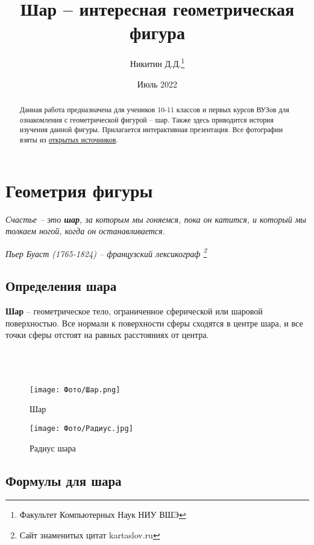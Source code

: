 \documentclass[14pt,a4paper]{report}
\title{Шар -- интересная геометрическая фигура}
\author{Никитин Д.Д.\thanks{Факультет Компьютерных Наук НИУ ВШЭ}}
\date{Июль 2022}
\begin{document}
\maketitle


\begin{abstract}
Данная работа предназначена для учеников 10-11 классов и первых курсов ВУЗов для ознакомления с геометрической фигурой -- шар. Также здесь приводится история изучения данной фигуры. Прилагается интерактивная презентация. Все фотографии взяты из \underline{открытых источников}.
\end{abstract}


\tableofcontents
\chapter{Геометрия фигуры}

\begin{displayquote}
\textit{Счастье -- это \textbf{шар}, за которым мы гоняемся, пока он катится, и который мы толкаем ногой, когда он останавливается.}
\end{displayquote}
\begin{flushright}
\textit{Пьер Буаст (1765-1824) -- французский лексикограф \footnote[1]{Сайт знаменитых цитат kartaslov.ru}}
\end{flushright}

\section[Определения]{Определения шара}


\textbf{Шар} -- геометрическое тело, ограниченное сферической или шаровой  поверхностью. Все нормали к поверхности сферы сходятся в центре шара, и все точки сферы отстоят на равных расстояниях от центра. \cite{dictionary1890efrona} \\\\\\\\

\begin{figure}[htb]
    \texttt{[image: Фото/Шар.png]}
    \caption{Шар}
\endminipage\hfill
{}
    \texttt{[image: Фото/Радиус.jpg]}
    \caption{Радиус шара}
\endminipage
\end{figure}

\newpage


\section[Формулы]{Формулы для шара}
\end{document}
